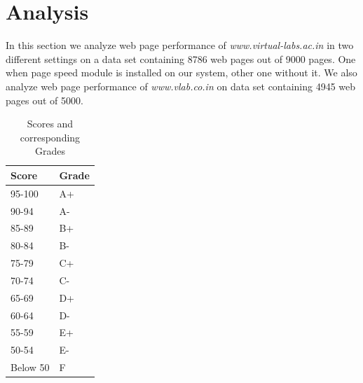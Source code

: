 \documentclass[conference]{IEEEtran}
\begin{document}
\section{Analysis}\label{sec-6}
In this section we analyze web page performance of {\it www.virtual-labs.ac.in} in two different settings on a data set containing 8786 web pages
out of 9000 pages.
One when page speed module is installed on our system, other one without it. We also analyze web page performance of {\it www.vlab.co.in}  
on data set containing 4945 web pages out of 5000.
\begin{table}
\begin{center}
\begin{tabular}{|l|l|}\hline
    Score  &  Grade  \\ \hline
   95-100  &  A+     \\ \hline
    90-94  &  A-     \\ \hline
    85-89  &  B+     \\ \hline
    80-84  &  B-     \\ \hline
    75-79  &  C+     \\ \hline
    70-74  &  C-     \\ \hline
    65-69  &  D+     \\ \hline
    60-64  &  D-     \\ \hline
    55-59  &  E+     \\ \hline
    50-54  &  E-     \\ \hline
 Below 50  &  F      \\ \hline
\end{tabular}
\end{center}
\caption{Scores and corresponding Grades}
\end{table}
\end{document}
